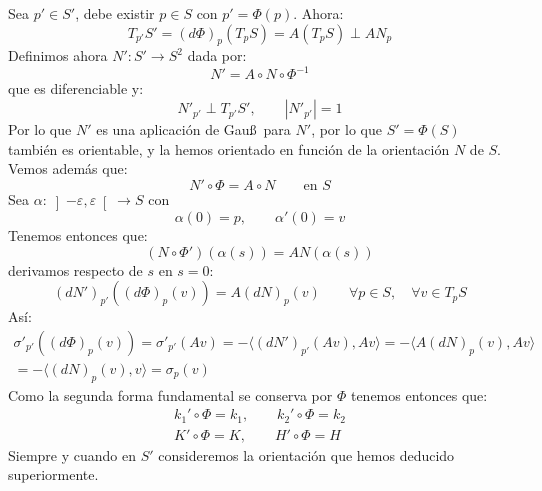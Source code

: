\begin{ejercicio}
    \noindent
    Sea $p'\in S'$, debe existir $p\in S$ con $p'=\Phi(p)$. Ahora:
    \begin{equation*}
        T_{p'}S' = (d\Phi)_p(T_pS) = A(T_pS) \perp AN_p
    \end{equation*}
    Definimos ahora $N':S'\to S^2$ dada por:
    \begin{equation*}
        N' = A\circ N\circ \Phi^{-1}
    \end{equation*}
    que es diferenciable y:
    \begin{equation*}
        N'_{p'} \perp T_{p'}S', \qquad |N'_{p'}| = 1
    \end{equation*}
    Por lo que $N'$ es una aplicación de Gau\ss\ para $N'$, por lo que $S' = \Phi(S)$ también es orientable, y la hemos orientado en función de la orientación $N$ de $S$. Vemos además que:
    \begin{equation*}
        N'\circ \Phi = A\circ N \qquad \text{en\ } S
    \end{equation*}
    Sea $\alpha:\left]-\varepsilon,\varepsilon\right[\to S$ con
    \begin{equation*}
        \alpha(0) = p, \qquad \alpha'(0) = v
    \end{equation*}
    Tenemos entonces que:
    \begin{equation*}
        (N\circ \Phi')(\alpha(s)) = AN(\alpha(s))
    \end{equation*}
    derivamos respecto de $s$ en $s=0$:
    \begin{equation*}
        (dN')_{p'}((d\Phi)_p(v)) = A(dN)_p(v) \qquad \forall p\in S, \quad \forall v\in T_pS
    \end{equation*}
    Así:
    \begin{multline*}
        \sigma'_{p'}((d\Phi)_p(v)) = \sigma'_{p'}(Av) = -\langle (dN')_{p'}(Av),Av \rangle  = -\langle A(dN)_p(v),Av \rangle \\ = -\langle (dN)_p(v),v \rangle = \sigma_p(v)
    \end{multline*}
    Como la segunda forma fundamental se conserva por $\Phi$ tenemos entonces que:
    \begin{gather*}
        k_1'\circ \Phi = k_1, \qquad k_2'\circ \Phi = k_2 \\
        K'\circ \Phi = K, \qquad H'\circ \Phi = H
    \end{gather*}
    Siempre y cuando en $S'$ consideremos la orientación que hemos deducido superiormente.
\end{ejercicio}

